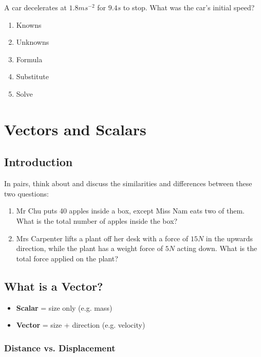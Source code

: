 \documentclass{report}
\begin{document}
A car decelerates at $1.8ms^{-2}$ for $9.4s$ to stop. What was the car's initial speed?

\begin{enumerate}
\item Knowns
\item Unknowns
\item Formula 
\item Substitute
\item Solve
\end{enumerate}

\vspace{3cm}

\newpage
\chapter{Vectors and Scalars}

\section{Introduction}

In pairs, think about and discuss the similarities and differences between these two questions:

\begin{enumerate}
    \item Mr Chu puts 40 apples inside a box, except Miss Nam eats two of them. What is the total number of apples inside the box?
    \item Mrs Carpenter lifts a plant off her desk with a force of $15N$ in the upwards direction, while the plant has a weight force of $5N$ acting down. What is the total force applied on the plant?
\end{enumerate}

\section{What is a Vector?}

\begin{itemize}
    \item \textbf{Scalar} = size only (e.g. mass)
    \item \textbf{Vector} = size + direction (e.g. velocity)
\end{itemize}

\subsection{Distance vs. Displacement}
\end{document}
